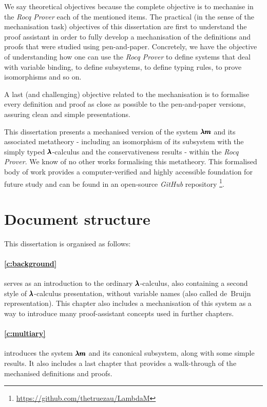 We say theoretical objectives because the complete objective is to mechanise in the \textit{Rocq Prover} each of the mentioned items.
The practical (in the sense of the mechanisation task) objectives of this dissertation are first to understand the proof assistant in order to fully develop a mechanisation of the definitions and proofs that were studied using pen-and-paper.
Concretely, we have the objective of understanding how one can use the \textit{Rocq Prover} to define systems that deal with variable binding, to define subsystems, to define typing rules, to prove isomorphisms and so on.

A last (and challenging) objective related to the mechanisation is to formalise every definition and proof as close as possible to the pen-and-paper versions, assuring clean and simple presentations.

This dissertation presents a mechanised version of the system $\pmb{\lambda m}$ and its associated metatheory - including an isomorphism of its subsystem with the simply typed $\pmb{\lambda}$-calculus and the conservativeness results - within the \textit{Rocq Prover}.
We know of no other works formalising this metatheory.
This formalised body of work provides a computer-verified and highly accessible foundation for future study and can be found in an open-source \textit{GitHub} repository \footnote{\href{https://github.com/thetruezau/LambdaM}{https://github.com/thetruezau/LambdaM}}.

\section{Document structure}

This dissertation is organised as follows:


\paragraph{\cref{c:background}}
serves as an introduction to the ordinary $\pmb{\lambda}$-calculus, also containing a second style of $\pmb{\lambda}$-calculus presentation, without variable names (also called de~Bruijn representation).
This chapter also includes a mechanisation of this system as a way to introduce many proof-assistant concepts used in further chapters.

\paragraph{\cref{c:multiary}} introduces the system $\pmb{\lambda m}$ and its canonical subsystem, along with some simple results.
It also includes a last chapter that provides a walk-through of the mechanised definitions and proofs.

